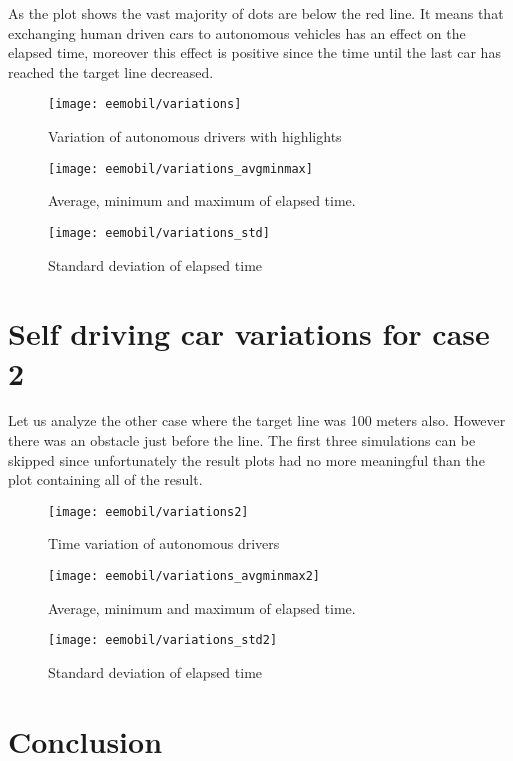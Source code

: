 		As the plot shows the vast majority of dots are below the red line. It means that exchanging human driven cars to autonomous vehicles has an effect on the  elapsed time, moreover this effect is positive since the time until the last car has reached the target line decreased.
		\begin{figure}
			\centering
			\texttt{[image: eemobil/variations]}
			\caption{Variation of autonomous drivers with highlights}
			\label{fig:self_variations}
		\end{figure}
		\begin{figure}
			\centering
			\texttt{[image: eemobil/variations\_avgminmax]}
			\caption{Average, minimum and maximum of elapsed time.}
			\label{fig:self_variations_avgminmax}
		\end{figure}
		
		\begin{figure}
			\centering
			\texttt{[image: eemobil/variations\_std]}
			\caption{Standard deviation of elapsed time}
			\label{fig:self_variations_std}
		\end{figure}
	\section{Self driving car variations for case 2}
		Let us analyze the other case where the target line was 100 meters also. However there was an obstacle just before the line. The first three simulations can be skipped since unfortunately the result plots had no more meaningful than the plot containing all of the result.
		\begin{figure}
			\centering
			\texttt{[image: eemobil/variations2]}
			\caption{Time variation of autonomous drivers}
			\label{fig:self_variations2}
		\end{figure}
		\begin{figure}
			\centering
			\texttt{[image: eemobil/variations\_avgminmax2]}
			\caption{Average, minimum and maximum of elapsed time.}
			\label{fig:self_variations_avgminmax2}
		\end{figure}
		\begin{figure}
			\centering
			\texttt{[image: eemobil/variations\_std2]}
			\caption{Standard deviation of elapsed time}
			\label{fig:self_variations_std2}
		\end{figure}
	\section{Conclusion}
